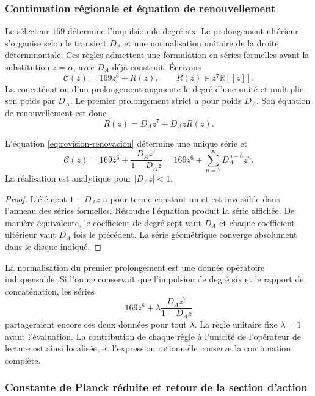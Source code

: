 \subsubsection{Continuation régionale et équation de renouvellement}

Le sélecteur \(169\) détermine l'impulsion de degré six. Le prolongement
ultérieur s'organise selon le transfert \(D_A\) et une normalisation
unitaire de la droite déterminantale. Ces règles admettent une formulation
en séries formelles avant la substitution \(z=\alpha\), avec \(D_A\) déjà
construit. Écrivons
\[
 \mathscr C(z)=169z^6+R(z),\qquad R(z)\in z^7\mathbb R[[z]].
\]
La concaténation d'un prolongement augmente le degré d'une unité et
multiplie son poids par \(D_A\). Le premier prolongement strict a pour
poids \(D_A\). Son équation de renouvellement est donc
\begin{equation}
 R(z)=D_Az^7+D_AzR(z).
 \label{eq:revision-renovacion}
\end{equation}

\begin{proposition}
L'équation \eqref{eq:revision-renovacion} détermine une unique série et
\[
 \mathscr C(z)=169z^6+\frac{D_Az^7}{1-D_Az}
             =169z^6+\sum_{n=7}^{\infty}D_A^{n-6}z^n.
\]
La réalisation est analytique pour \(|D_Az|<1\).
\end{proposition}
\begin{proof}
L'élément \(1-D_Az\) a pour terme constant un et est inversible
dans l'anneau des séries formelles. Résoudre l'équation produit la série
affichée. De manière équivalente, le coefficient de degré sept vaut \(D_A\)
et chaque coefficient ultérieur vaut \(D_A\) fois le précédent. La série
géométrique converge absolument dans le disque indiqué.
\end{proof}

La normalisation du premier prolongement est une donnée opératoire
indispensable. Si l'on ne conservait que l'impulsion de degré six et
le rapport de concaténation, les séries
\[
 169z^6+\lambda\frac{D_Az^7}{1-D_Az}
\]
partageraient encore ces deux données pour tout \(\lambda\).
La règle unitaire fixe \(\lambda=1\) avant l'évaluation.
La contribution de chaque règle à l'unicité de l'opérateur de lecture
est ainsi localisée, et l'expression rationnelle conserve la continuation complète.

\subsubsection{Constante de Planck réduite et retour de la section d'action}

